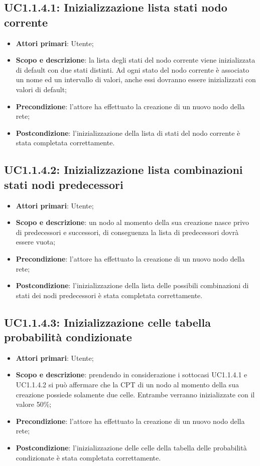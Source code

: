 \subsection{UC1.1.4.1: Inizializzazione lista stati nodo corrente} 
\hypertarget{UC1.1.4.1}{} 
\begin{itemize} 
	\item{\textbf{Attori primari}: Utente;} 
	\item{\textbf{Scopo e descrizione}: la lista degli stati del nodo corrente viene inizializzata di default con due stati distinti. Ad ogni stato del nodo corrente è associato un nome ed un intervallo di valori, anche essi dovranno essere inizializzati con valori di default;} 
	\item{\textbf{Precondizione}: l'attore ha effettuato la creazione di un nuovo nodo della rete;} 
	\item{\textbf{Postcondizione}: l'inizializzazione della lista di stati del nodo corrente è stata completata correttamente.} 
\end{itemize} 
\subsection{UC1.1.4.2: Inizializzazione lista combinazioni stati nodi predecessori} 
\hypertarget{UC1.1.4.2}{} 
\begin{itemize} 
	\item{\textbf{Attori primari}: Utente;} 
	\item{\textbf{Scopo e descrizione}: un nodo al momento della sua creazione nasce privo di predecessori e successori, di conseguenza la lista di predecessori dovrà essere vuota;} 
	\item{\textbf{Precondizione}: l'attore ha effettuato la creazione di un nuovo nodo della rete;} 
	\item{\textbf{Postcondizione}: l'inizializzazione della lista delle possibili combinazioni di stati dei nodi predecessori è stata completata correttamente.} 
\end{itemize} 
\subsection{UC1.1.4.3: Inizializzazione celle tabella probabilità condizionate} 
\hypertarget{UC1.1.4.3}{} 
\begin{itemize} 
	\item{\textbf{Attori primari}: Utente;} 
	\item{\textbf{Scopo e descrizione}: prendendo in considerazione i sottocasi UC1.1.4.1 e UC1.1.4.2 si può affermare che la CPT di un nodo al momento della sua creazione possiede solamente due celle. Entrambe verranno inizializzate con il valore 50\%;} 
	\item{\textbf{Precondizione}: l'attore ha effettuato la creazione di un nuovo nodo della rete;} 
	\item{\textbf{Postcondizione}: l'inizializzazione delle celle della tabella delle probabilità condizionate è stata completata correttamente.} 
\end{itemize} 
